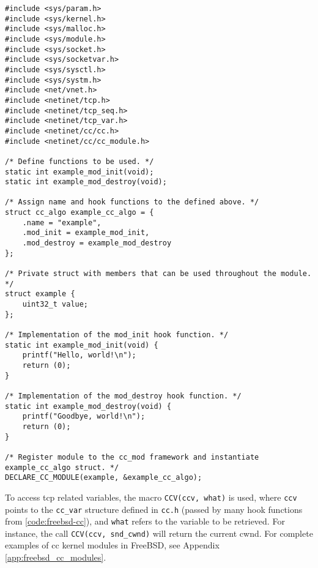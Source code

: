 \begin{code}
\begin{verbatim}
#include <sys/param.h>
#include <sys/kernel.h>
#include <sys/malloc.h>
#include <sys/module.h>
#include <sys/socket.h>
#include <sys/socketvar.h>
#include <sys/sysctl.h>
#include <sys/systm.h>
#include <net/vnet.h>
#include <netinet/tcp.h>
#include <netinet/tcp_seq.h>
#include <netinet/tcp_var.h>
#include <netinet/cc/cc.h>
#include <netinet/cc/cc_module.h>

/* Define functions to be used. */
static int example_mod_init(void);
static int example_mod_destroy(void);

/* Assign name and hook functions to the defined above. */
struct cc_algo example_cc_algo = {
    .name = "example",
    .mod_init = example_mod_init,
    .mod_destroy = example_mod_destroy
};

/* Private struct with members that can be used throughout the module. */
struct example {
    uint32_t value;
};

/* Implementation of the mod_init hook function. */
static int example_mod_init(void) {
    printf("Hello, world!\n");
    return (0);
}

/* Implementation of the mod_destroy hook function. */
static int example_mod_destroy(void) {
    printf("Goodbye, world!\n");
    return (0);
}

/* Register module to the cc_mod framework and instantiate example_cc_algo struct. */
DECLARE_CC_MODULE(example, &example_cc_algo);
\end{verbatim}
\label{code:freebsd-cc}
\end{code}

To access \gls{tcp} related variables, the macro \lstinline{CCV(ccv, what)} is used, where \lstinline{ccv} points to the \lstinline{cc_var} structure defined in \lstinline{cc.h} (passed by many hook functions from \ref{code:freebsd-cc}), and \lstinline{what} refers to the variable to be retrieved. For instance, the call \lstinline{CCV(ccv, snd_cwnd)} will return the current \gls{cwnd}. For complete examples of \gls{cc} kernel modules in FreeBSD, see Appendix \ref{app:freebsd_cc_modules}.









